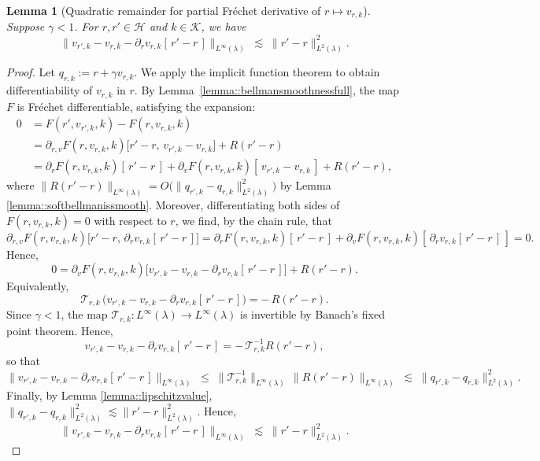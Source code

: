 \documentclass[11pt]{article}
\theoremstyle{plain}
\newtheorem{lemma}[theorem]{Lemma}
\begin{document}
 
\begin{lemma}[Quadratic remainder for partial Fréchet derivative of $r \mapsto v_{r,k}$]
 \label{lemma::valuefirstderivativeexpansion}
 Suppose $\gamma < 1$. For $r,r' \in \mathcal{H}$ and $k \in \mathcal{K}$, we have
\[
\big\|v_{r',k} - v_{r,k} - \partial_r v_{r,k}[\,r' - r\,]\big\|_{L^\infty(\lambda)}
\;\lesssim\; \|r' - r\|_{L^2(\lambda)}^2.
\]
\end{lemma}
\begin{proof}
Let $q_{r,k} := r + \gamma v_{r,k}$.  We apply the implicit function theorem to obtain differentiability of $v_{r,k}$ in $r$. By Lemma~\ref{lemma::bellmansmoothnessfull}, the map $F$ is Fr\'echet differentiable, satisfying the expansion:
\begin{align*}
0 
&= F(r', v_{r',k}, k) - F(r, v_{r,k}, k) \\
&= \partial_{r,v} F(r, v_{r,k}, k)\big[r' - r,\, v_{r',k} - v_{r,k}\big] + R(r' - r) \\
&= \partial_r F(r, v_{r,k}, k)[\,r' - r\,] 
  + \partial_v F(r, v_{r,k}, k)[\,v_{r',k} - v_{r,k}\,] + R(r' - r),
\end{align*}
where $\|R(r' - r)\|_{L^\infty(\lambda)} = O\!\big(\|q_{r',k} - q_{r,k}\|_{L^2(\lambda)}^2\big)$ by Lemma \ref{lemma::softbellmanissmooth}.
Moreover, differentiating both sides of $F(r, v_{r,k}, k) = 0$ with respect to $r$, we find, by the chain rule, that
\[
\partial_{r,v}F(r,v_{r,k},k)\big[r' - r,\,\partial_r v_{r,k}[\,r' - r\,]\big] 
= \partial_r F(r,v_{r,k},k)[\,r' - r\,] 
+ \partial_v F(r,v_{r,k},k)[\,\partial_r v_{r,k}[\,r' - r\,]\,] 
= 0.
\]
Hence,
\[
0 
= \partial_v F(r, v_{r,k}, k)\big[v_{r',k} - v_{r,k} - \partial_r v_{r,k}[\,r' - r\,]\big] 
   + R(r' - r).
\]
Equivalently,
\[
\mathcal{T}_{r,k}\,\big(v_{r',k} - v_{r,k} - \partial_r v_{r,k}[\,r' - r\,]\big) = -\,R(r' - r).
\]
Since $\gamma < 1$, the map $\mathcal{T}_{r,k}: L^\infty(\lambda) \rightarrow L^\infty(\lambda)$ is invertible by Banach's fixed point theorem. Hence,
\[
v_{r',k} - v_{r,k} - \partial_r v_{r,k}[\,r' - r\,]
= -\,\mathcal{T}_{r,k}^{-1} R(r' - r),
\]
so that
\[
\big\|v_{r',k} - v_{r,k} - \partial_r v_{r,k}[\,r' - r\,]\big\|_{L^\infty(\lambda)}
\;\le\; \|\mathcal{T}_{r,k}^{-1}\|_{L^\infty(\lambda)}\,\|R(r' - r)\|_{L^\infty(\lambda)}
\;\lesssim\; \|q_{r',k} - q_{r,k}\|_{L^2(\lambda)}^2.
\]
Finally, by Lemma \ref{lemma::lipschitzvalue}, $ \|q_{r',k} - q_{r,k}\|_{L^2(\lambda)}^2 \lesssim  \|r' - r\|_{L^2(\lambda)}^2$. Hence,
\[
\big\|v_{r',k} - v_{r,k} - \partial_r v_{r,k}[\,r' - r\,]\big\|_{L^\infty(\lambda)}
 \;\lesssim\; \|r' - r\|_{L^2(\lambda)}^2.
\]
\end{proof}
\end{document}
